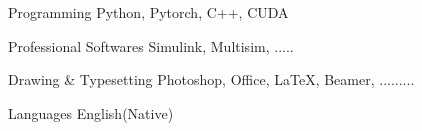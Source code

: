 \begin{cvskills}

  \cvskill
  {Programming} %
  {Python, Pytorch, C++, CUDA} %

  \cvskill
  {Professional Softwares} %
  {Simulink, Multisim, .....} %

  \cvskill
  {Drawing \& Typesetting} %
  {Photoshop, Office, \textrm{\LaTeX}, Beamer, .........} %

  \cvskill
  {Languages} %
  {English(Native)} %
  \vspace{-8.0mm}
\end{cvskills}
